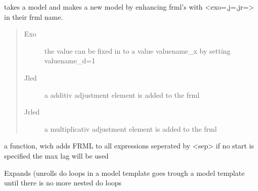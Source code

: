 \documentclass[letterpaper,10pt,english]{sphinxmanual}
\begin{document}

\begin{fulllineitems}
\label{\detokenize{onboard/modelmanipulation:modelmanipulation.exounroll}}
\pysigstartsignatures
{}
\pysigstopsignatures
\sphinxAtStartPar
takes a model and makes a new model by enhancing frml’s with \textless{}exo=,j=,jr=\textgreater{}
in their frml name.
\begin{quote}\begin{description}
\item[{Exo}] \leavevmode
\sphinxAtStartPar
the value can be fixed in to a value valuename\_x by setting valuename\_d=1

\item[{Jled}] \leavevmode
\sphinxAtStartPar
a additiv adjustment element is added to the frml

\item[{Jrled}] \leavevmode
\sphinxAtStartPar
a multiplicativ adjustment element is added to the frml

\end{description}\end{quote}

\end{fulllineitems}


\begin{fulllineitems}
\label{\detokenize{onboard/modelmanipulation:modelmanipulation.tofrml}}
\pysigstartsignatures
{}
\pysigstopsignatures
\sphinxAtStartPar
a function, wich adds FRML to all expressions seperated by \textless{}sep\textgreater{}
if no start is specified the max lag will be used

\end{fulllineitems}


\begin{fulllineitems}
\label{\detokenize{onboard/modelmanipulation:modelmanipulation.dounloop}}
\pysigstartsignatures
{}
\pysigstopsignatures
\sphinxAtStartPar
Expands (unrolls  do loops in a model template
goes trough a model template until there is no more nested do loops

\end{fulllineitems}
\end{document}
